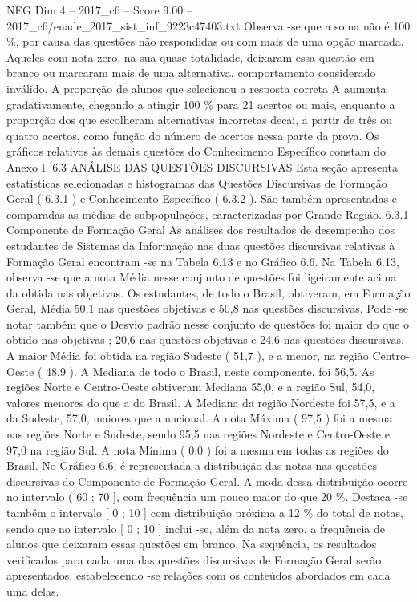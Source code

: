 \begin{textsample}{NEG Dim 4 – 2017\_c6 – Score 9.00 – 2017\_c6/enade\_2017\_sist\_inf\_9223c47403.txt}
Observa -se que a soma não é 100 \%, por causa das questões não respondidas ou com mais de uma opção marcada.
Aqueles com nota zero, na sua quase totalidade, deixaram essa questão em branco ou marcaram mais de uma alternativa, comportamento considerado inválido.
A proporção de alunos que selecionou a resposta correta A aumenta gradativamente, chegando a atingir 100 \% para 21 acertos ou mais, enquanto a proporção dos que escolheram alternativas incorretas decai, a partir de três ou quatro acertos, como função do número de acertos nessa parte da prova.
Os gráficos relativos às demais questões do Conhecimento Específico constam do Anexo I. 6.3 ANÁLISE DAS QUESTÕES DISCURSIVAS Esta seção apresenta estatísticas selecionadas e histogramas das Questões Discursivas de Formação Geral ( 6.3.1 ) e Conhecimento Específico ( 6.3.2 ).
São também apresentadas e comparadas as médias de subpopulações, caracterizadas por Grande Região. 6.3.1 Componente de Formação Geral As análises dos resultados de desempenho dos estudantes de Sistemas da Informação nas duas questões discursivas relativas à Formação Geral encontram -se na Tabela 6.13 e no Gráfico 6.6.
Na Tabela 6.13, observa -se que a nota Média nesse conjunto de questões foi ligeiramente acima da obtida nas objetivas.
Os estudantes, de todo o Brasil, obtiveram, em Formação Geral, Média 50,1 nas questões objetivas e 50,8 nas questões discursivas.
Pode -se notar também que o Desvio padrão nesse conjunto de questões foi maior do que o obtido nas objetivas ; 20,6 nas questões objetivas e 24,6 nas questões discursivas.
A maior Média foi obtida na região Sudeste ( 51,7 ), e a menor, na região Centro-Oeste ( 48,9 ).
A Mediana de todo o Brasil, neste componente, foi 56,5.
As regiões Norte e Centro-Oeste obtiveram Mediana 55,0, e a região Sul, 54,0, valores menores do que a do Brasil.
A Mediana da região Nordeste foi 57,5, e a da Sudeste, 57,0, maiores que a nacional.
A nota Máxima ( 97,5 ) foi a mesma nas regiões Norte e Sudeste, sendo 95,5 nas regiões Nordeste e Centro-Oeste e 97,0 na região Sul.
A nota Mínima ( 0,0 ) foi a mesma em todas as regiões do Brasil.
No Gráfico 6.6, é representada a distribuição das notas nas questões discursivas do Componente de Formação Geral.
A moda dessa distribuição ocorre no intervalo ( 60 ; 70 ], com frequência um pouco maior do que 20 \%.
Destaca -se também o intervalo [ 0 ; 10 ] com distribuição próxima a 12 \% do total de notas, sendo que no intervalo [ 0 ; 10 ] inclui -se, além da nota zero, a frequência de alunos que deixaram essas questões em branco.
Na sequência, os resultados verificados para cada uma das questões discursivas de Formação Geral serão apresentados, estabelecendo -se relações com os conteúdos abordados em cada uma delas.

\end{textsample}
